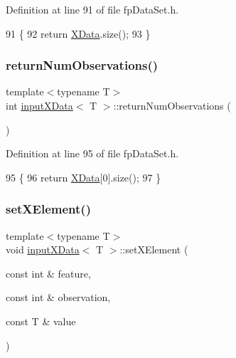 Definition at line 91 of file fp\+Data\+Set.\+h.


\begin{DoxyCode}
91                                       \{
92             \textcolor{keywordflow}{return} \hyperlink{classinputXData_aff55a72217a7a3b66df91d01840e4206}{XData}.size();
93         \}
\end{DoxyCode}
\mbox{\label{classinputXData_a127317d1c076a4a891e20386db93f008}} 
\subsubsection{\texorpdfstring{return\+Num\+Observations()}{returnNumObservations()}}
{\footnotesize\ttfamily template$<$typename T$>$ \\
int \hyperlink{classinputXData}{input\+X\+Data}$<$ T $>$\+::return\+Num\+Observations (\begin{DoxyParamCaption}{ }\end{DoxyParamCaption})\hspace{0.3cm}{\ttfamily [inline]}}



Definition at line 95 of file fp\+Data\+Set.\+h.


\begin{DoxyCode}
95                                           \{
96             \textcolor{keywordflow}{return} \hyperlink{classinputXData_aff55a72217a7a3b66df91d01840e4206}{XData}[0].size();
97         \}
\end{DoxyCode}
\mbox{\label{classinputXData_a8f59e3a3f79f9da1a032bffe66e182ed}} 
\subsubsection{\texorpdfstring{set\+X\+Element()}{setXElement()}}
{\footnotesize\ttfamily template$<$typename T$>$ \\
void \hyperlink{classinputXData}{input\+X\+Data}$<$ T $>$\+::set\+X\+Element (\begin{DoxyParamCaption}\item[{const int \&}]{feature,  }\item[{const int \&}]{observation,  }\item[{const T \&}]{value }\end{DoxyParamCaption})\hspace{0.3cm}{\ttfamily [inline]}}



